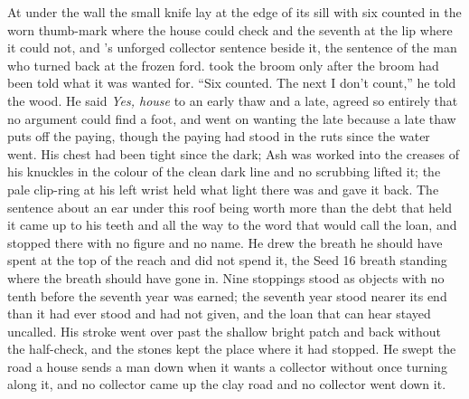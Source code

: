 At  under the wall the small knife lay at the edge of its sill with six counted in the worn thumb-mark where the house could check and the seventh at the lip where it could not, and 's unforged collector sentence beside it, the sentence of the man who turned back at the frozen ford.  took the broom only after the broom had been told what it was wanted for. “Six counted. The next I don't count,” he told the wood. He said \emph{Yes, house} to an early thaw and a late, agreed so entirely that no argument could find a foot, and went on wanting the late because a late thaw puts off the paying, though the paying had stood in the ruts since the water went. His chest had been tight since the dark; Ash was worked into the creases of his knuckles in the colour of the clean dark line and no scrubbing lifted it; the pale clip-ring at his left wrist held what light there was and gave it back. The sentence about an ear under this roof being worth more than the debt that held it came up to his teeth and all the way to the word that would call the loan, and stopped there with no figure and no name. He drew the breath he should have spent at the top of the reach and did not spend it, the Seed 16 breath standing where the breath should have gone in. Nine stoppings stood as objects with no tenth before the seventh year was earned; the seventh year stood nearer its end than it had ever stood and had not given, and the loan that can hear stayed uncalled. His stroke went over  past the shallow bright patch and back without the half-check, and the stones kept the place where it had stopped. He swept the road a house sends a man down when it wants a collector without once turning along it, and no collector came up the clay road and no collector went down it.

\scenebreak

